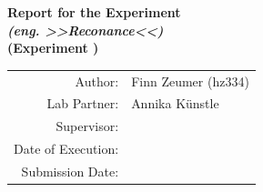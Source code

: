 \begin{titlepage}
\vspace*{2cm} 
  
  \centering
    
  {\LARGE\bfseries Report for the Experiment \\[0.2cm]
  \textit{\versuchsname{\versuchsnummer} (eng. >>Reconance<<)} \\[0.5cm] %
  {\large (Experiment {\versuchsnummer})} 
  \vspace{1cm}}

  {\large
  \begin{tabular}{@{}rl@{}}
    Author:                  & Finn Zeumer (hz334)\\
    Lab Partner:        & Annika Künstle\\[0.5em]
    Supervisor:      & {\begleiter{\versuchsnummer}}\\[0.5em]
    Date of Execution:   & {\durchfuehrungsdatum{\versuchsnummer}}\\
    \small{Submission Date:}    & \small{\abgabedatum{\versuchsnummer}}\\
  \end{tabular}
  }
  \vfill


  
\end{titlepage}